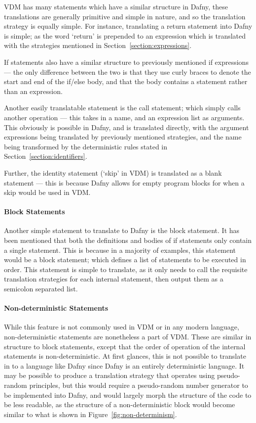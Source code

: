 \documentclass{entcs}
\begin{document}
VDM has many statements which have a similar structure in Dafny, these translations are generally primitive and simple in nature, and so the translation strategy is equally simple. For instance, translating a return statement into Dafny is simple; as the word `return' is prepended to an expression which is translated with the strategies mentioned in Section~\ref{section:expressions}. 

If statements also have a similar structure to previously mentioned if expressions --- the only difference between the two is that they use curly braces to denote the start and end of the if/else body, and that the body contains a statement rather than an expression. 

Another easily translatable statement is the call statement; which simply calls another operation --- this takes in a name, and an expression list as arguments. This obviously is possible in Dafny, and is translated directly, with the argument expressions being translated by previously mentioned strategies, and the name being transformed by the deterministic rules stated in Section~\ref{section:identifiers}.

Further, the identity statement (`skip' in VDM) is translated as a blank statement --- this is because Dafny allows for empty program blocks for when a skip would be used in VDM. 

\paragraph{Block Statements}

Another simple statement to translate to Dafny is the block statement. It has been mentioned that both the definitions and bodies of if statements only contain a single statement. This is because in a majority of examples, this statement would be a block statement; which defines a list of statements to be executed in order. This statement is simple to translate, as it only needs to call the requisite translation strategies for each internal statement, then output them as a semicolon separated list.

\paragraph{Non-deterministic Statements}

While this feature is not commonly used in VDM or in any modern language, non-deterministic statements are nonetheless a part of VDM. These are similar in structure to block statements, except that the order of operation of the internal statements is non-deterministic. At first glances, this is not possible to translate in to a language like Dafny since Dafny is an entirely deterministic language. It may be possible to produce a translation strategy that operates using pseudo-random principles, but this would require a pseudo-random number generator to be implemented into Dafny, and would largely morph the structure of the code to be less readable, as the structure of a non-deterministic block would become similar to what is shown in Figure~\ref{fig:non-determinism}.
\end{document}
